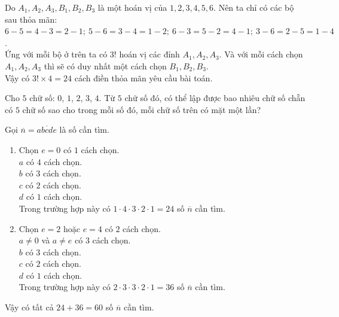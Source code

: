 \begin{ex}
{{}\noindent
Do $ A_1, A_2, A_3,  B_1, B_2, B_3$ là một hoán vị của $1, 2, 3, 4, 5, 6$.
Nên ta chỉ có các bộ sau thỏa mãn: $6-5 = 4-3 = 2-1;\ 5-6 = 3-4 = 1-2;\ 6-3 = 5-2 = 4-1;\  3-6 = 2-5 = 1-4$.\\
Ứng với mỗi bộ ở trên ta có $3!$ hoán vị các đỉnh $ A_1, A_2, A_3$.
Và với mỗi cách chọn $ A_1, A_2, A_3$ thì sẽ có duy nhất một cách chọn $B_1, B_2, B_3$.\\
Vậy có $3!\times 4=24$ cách điền thỏa mãn yêu cầu bài toán.
}
\end{ex}

\begin{bt}%
	Cho $5$ chữ số: $0$, $1$, $2$, $3$, $4$. Từ $5$ chữ số đó, có thể lập được bao nhiêu chữ số chẵn có $5$ chữ số sao cho trong mỗi số đó, mỗi chữ số trên có mặt một lần?
	\loigiai
	{
		Gọi $\overline{n}=\overline{abcde}$ là số cần tìm.
		\begin{enumerate}[TH 1.]
			\item Chọn $e=0$ có $1$ cách chọn.\\
			$a$ có $4$ cách chọn.\\
			$b$ có $3$ cách chọn.\\
			$c$ có $2$ cách chọn.\\
			$d$ có $1$ cách chọn.\\
			Trong trường hợp này có $1\cdot4\cdot3\cdot2\cdot1=24$ số $\overline{n}$ cần tìm.
			\item Chọn $e=2$ hoặc $e=4$ có $2$ cách chọn.\\
			$a \ne 0$ và $a \ne e$ có $3$ cách chọn.\\
			$b$ có $3$ cách chọn.\\
			$c$ có $2$ cách chọn.\\
			$d$ có $1$ cách chọn.\\
			Trong trường hợp này có $2\cdot3\cdot3\cdot2\cdot1=36$ số $\overline{n}$ cần tìm.
		\end{enumerate}
		Vậy có tất cả $24+36=60$ số $\overline{n}$ cần tìm.
	}
\end{bt}

